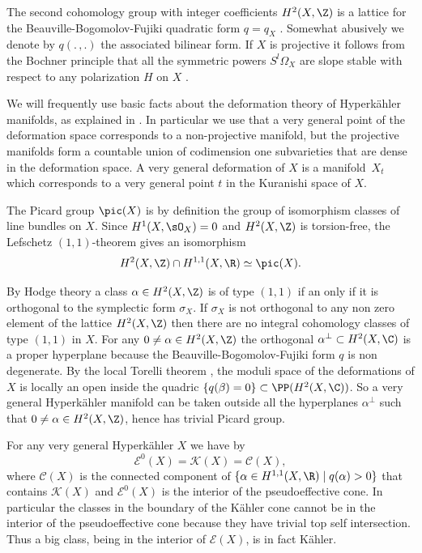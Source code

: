 The second cohomology group with integer coefficients $H^2(X,\Z)$
is a lattice for the Beauville-Bogomolov-Fujiki quadratic form $q=q_X$ \cite[\S 8]{Bea83}. Somewhat abusively we denote by
$q(. \,, .)$ the associated bilinear form.
If $X$ is projective it follows from the Bochner principle that all the symmetric powers $S^l \Omega_X$ are slope stable
with respect to any polarization $H$ on $X$ \cite[Th.\,6]{Kob80}.

We will frequently use basic facts about the deformation theory of Hyperkähler manifolds, as explained in
\cite[\S 8]{Bea83} \cite[\S 1]{Huy99}. In particular we use that a very general point of the deformation
space corresponds to a non-projective manifold, but the projective manifolds form a countable union of codimension
one subvarieties that are dense in the deformation space. A very general deformation of $X$ is a manifold~$X_t$ which corresponds to a very general point $t$ in the Kuranishi space of $X$.

The Picard group $\pic (X)$ is by definition the group of isomorphism classes of line bundles on $X$.
Since $H^1(X, \sO_X)=0$ and $H^2(X, \Z)$ is torsion-free,
the Lefschetz $(1,1)$-theorem \cite[Prop.\,3.3.2]{Huy05} gives an isomorphism
\[
H^2(X, \Z) \cap H^{1,1}(X, \R) \simeq \pic (X).
\]

\begin{remark} \label{remarknosubvarieties}
By Hodge theory a class $\alpha \in H^2(X, \Z )$ is of type $(1,1)$ if an only if it is orthogonal to the symplectic form $\sigma_X$. If $\sigma_X$ is not orthogonal to any non zero element of the lattice $H^2(X, \Z )$ then there are no integral cohomology classes of type $(1,1)$ in $X$.
For any $0\neq \alpha \in H^2(X, \Z )$ the orthogonal $\alpha^\bot \subset H^2(X, \C )$ is a proper hyperplane because the Beauville-Bogomolov-Fujiki form $q$ is non degenerate. By the local Torelli theorem \cite[Th.\,5]{Bea83}, the moduli space of the deformations of $X$ is locally an open inside the quadric $\{ q(\beta)=0\} \subset \PP (H^2(X,\C))$. So a very general Hyperkähler manifold can be taken outside all the hyperplanes $\alpha^\bot $ such that $0\neq \alpha \in H^2(X, \Z)$, hence has trivial Picard group.
\end{remark}

\begin{remark} \label{remarkEgeneral}
For any very general Hyperkähler $X$ we have by \cite[Cor.\,1]{Huy03}
\[
\mathcal{E}^0(X)=\mathcal{K}(X) = \mathcal C (X),
\]
where $\mathcal C (X)$ is the connected component of $\{ \alpha \in H^{1,1}(X, \R) \mid q(\alpha)>0 \}$
that contains $\mathcal{K}(X)$ and $\mathcal{E}^0(X)$ is the interior of the pseudoeffective cone.
In particular the classes in the boundary of the Kähler cone cannot be in the interior of the pseudoeffective cone because they have trivial top self intersection. Thus a big class, being in the interior of $\mathcal E(X)$,
is in fact Kähler.
\end{remark}

